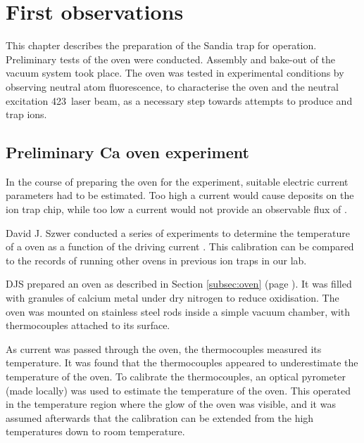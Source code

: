 \setcounter{chapter}{4} %
\chapter{First observations}
\label{chapter:firstobs}

This chapter describes the preparation of the Sandia trap for operation. Preliminary tests of the \CaI{} oven were conducted. Assembly and bake-out of the vacuum system took place. The \CaI{} oven was tested in experimental conditions by observing neutral atom fluorescence, to characterise the oven and the neutral excitation 423\nm\, laser beam, as a necessary step towards attempts to produce and trap ions.


\section{Preliminary Ca oven experiment}
\label{sec:oventest}

In the course of preparing the \CaI{} oven for the experiment, suitable electric current parameters had to be estimated. Too high a current would cause \CaI{} deposits on the ion trap chip, while too low a current would not  provide an observable flux of \CaI{}.

David J. Szwer conducted a series of experiments to determine the temperature of a \CaI{} oven as a function of the driving current \cite{Szwer2007}. This calibration can be compared to the records of running other \CaI{} ovens in previous ion traps in our lab.

DJS prepared an oven as described in Section \ref{subsec:oven} (page \pageref{subsec:oven}). It was filled with granules of calcium metal under dry nitrogen to reduce oxidisation. The oven was mounted on stainless steel rods inside a simple vacuum chamber, with thermocouples attached to its surface. 

As current was passed through the oven, the thermocouples measured its temperature. It was found that the thermocouples appeared to underestimate the temperature of the oven. To calibrate the thermocouples, an optical pyrometer (made locally) was used to estimate the temperature of the oven. This operated in the temperature region where the glow of the oven was visible, and it was assumed afterwards that the calibration can be extended from the high temperatures down to room temperature.

